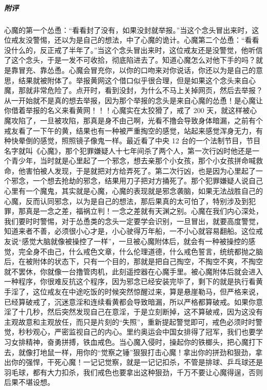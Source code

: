 \begin{case}
    \subparagraph{附评} 心魔的第一个怂恿：“看看封了没有，如果没封就举报。”当这个念头冒出来时，这位戒友没警惕，还以为是自己的想法，中了心魔的诡计。心魔第二个怂恿：“看看没什么的，反正戒了半年了。”当这个念头冒出来时，这位戒友还是没警觉，他听信了这个念头，于是一发不可收拾，彻底陷进去了。知道心魔怎么对他下手的吗？就是靠冒充、靠怂恿。心魔会冒充你，以你的口吻来对你说话，你还以为是自己的意思，结果就被附体了。举报黄网这个借口似乎很合理，但是如果这个念头来自心魔，那就非常危险了。点开时，看到没封，为什么不马上关掉网页，然后去举报？从一开始就不是真的想去举报，因为那个举报的念头是来自心魔的怂恿！是心魔让你借着举报的名义来看黄网！！！心魔实在太狡猾了，戒了 200 天，就这样被心魔攻陷了，一旦被攻陷，那真是身不由己啊，光看不撸会导致身体暗漏，之前有个戒友看了一下午的黄，结果也有一种被严重掏空的感觉，站起来感觉浑身无力，有种快晕倒的感觉，照照镜子像鬼一样。最近看了中央 12 台的一个法制节目，节目名字就叫《心魔》，那个犯罪嫌疑人十七年间杀了两个人，第一次行凶时他还是一个青少年，当时就是心里起了一个邪念，想去亲那个小女孩，那个小女孩拼命喊救命，他害怕被人发现，于是就把对方给弄死了。第二次行凶，也是因为心里起了一个邪念，一个想去抢劫的邪念，结果用刀子把对方捅死了。那个犯罪嫌疑人说自己心里有一个魔鬼，其实就是心魔，心魔的表现就是邪念袭脑，如果无法战胜自己的心魔，反而认同邪念，以为是自己的想法，那后果真的太可怕了，特别涉及到犯罪，那真是一念之差，福祸立判！一念之差就有天渊之别。心魔在我们内心深处，我们要时时警惕，对于怂恿类的念头一定要学会识别，一旦冒出，就要高度警觉，知道来者不善，必须很小心才是，小心驶得万年船，一不小心就容易翻船。这位戒友说“感觉大脑就像被操控了一样”，一旦被心魔附体后，就会有一种被操控的感觉，完全身不由己，什么戒色文章，什么伦理道德，什么戒色誓言，统统都抛之脑后，在被附体的状态下，只有一个目的，那就是把自己掏空，不掏空不爽，不掏空就不罢休，你就像一台撸管肉机，此刻遥控器在心魔手里。被心魔附体后就会进入一种程序，你很难反抗这个程序，因为邪念已经安装完毕了，剩下的就是执行看黄手淫了，这位戒友在中途吃饭的时候突然惊醒过来，算是悬崖勒马，但严格来说，已经算破戒了，沉迷意淫和连续看黄都会导致暗漏，所以严格都算破戒。如果你意淫了十几秒，然后突然发现自己在意淫，于是立刻断掉，这不算破戒，因为这没有主观故意和主观放任，而只是片刻的“失照”，重新提起警觉即可，戒色必须时时警觉，秒秒观心，严密监视自己的内心。里约奥运会中国女排得了冠军，我们也要学习女排精神，奋勇拼搏，铁血戒色。当心魔入侵时，操起你的铁榔头，把心魔打下去，就像打地鼠一样，用你的“觉察之锤”狠狠打击心魔！拿出你的拼劲和狠劲，拿出你的强悍，干死心魔！一记记觉察，就是一记记扣杀，不管是排球、乒乓球还是羽毛球，都有大力扣杀，我们戒色也要拿出这种狠劲，千万不要让心魔得逞，否则后果不堪设想。
\end{case}

